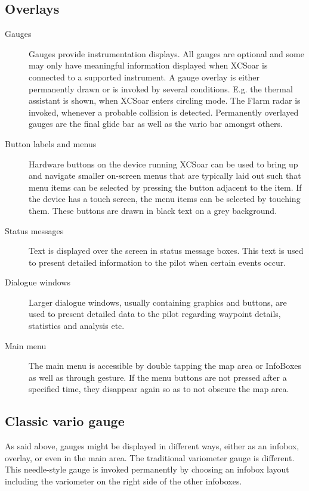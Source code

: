 \subsection*{Overlays}
\begin{description}
\item[Gauges]  Gauges provide instrumentation displays. All gauges are optional
and some may only have meaningful information displayed when XCSoar is
connected to a supported instrument.
A gauge overlay is either permanently drawn or is invoked by several 
conditions.  E.g. the thermal assistant is shown, when XCSoar enters circling 
mode. The Flarm radar is invoked, whenever a probable collision is detected. 
Permanently overlayed gauges are the final glide bar as well as the vario bar 
amongst others.
\item[Button labels and menus] Hardware buttons on the device running XCSoar
can be used to bring up and navigate smaller on-screen menus that are
typically laid out such that menu items can be selected by pressing the
button adjacent to the item.  If the device has a touch screen, the menu
items can be selected by touching them.  These buttons are drawn in black
text on a grey background.
\item[Status messages] Text is displayed over the screen in status message
boxes.  This text is used to present detailed information to the pilot when
certain events occur.
\item[Dialogue windows] Larger dialogue windows, usually containing graphics and
buttons, are used to present detailed data to the pilot regarding waypoint
details, statistics and analysis etc.
\item[Main menu] The main menu is accessible by double tapping the map area or
InfoBoxes as well as through gesture. If the menu buttons are not pressed after
 a specified time, they disappear again so as to not obscure 
the map area.
\end{description}

\subsection*{Classic vario gauge}
As said above, gauges might be displayed in different ways, either as an 
infobox, overlay, or even in the main area. The traditional variometer gauge is 
different. This needle-style gauge is invoked permanently by choosing an infobox 
layout including the variometer on the right side of the other infoboxes. 

